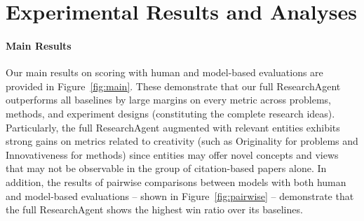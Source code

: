 \documentclass[11pt]{article}
\begin{document}



\begin{table}[t!]
\caption{Results of agreements between two human annotation results and between human and model evaluation results. }
\vspace{-0.075in}
\label{tab:agreement}
\small
\centering
{}
\vspace{-0.025in}
\end{table}



\section{Experimental Results and Analyses}
\label{sec:results}

\paragraph{Main Results}
Our main results on scoring with human and model-based evaluations are provided in Figure~\ref{fig:main}. These demonstrate that our full ResearchAgent outperforms all baselines by large margins on every metric across problems, methods, and experiment designs (constituting the complete research ideas). Particularly, the full ResearchAgent augmented with relevant entities exhibits strong gains on metrics related to creativity (such as Originality for problems and Innovativeness for methods) since entities may offer novel concepts and views that may not be observable in the group of citation-based papers alone. In addition, the results of pairwise comparisons between models with both human and model-based evaluations -- shown in Figure~\ref{fig:pairwise} -- demonstrate that the full ResearchAgent shows the highest win ratio over its baselines.  
\end{document}
